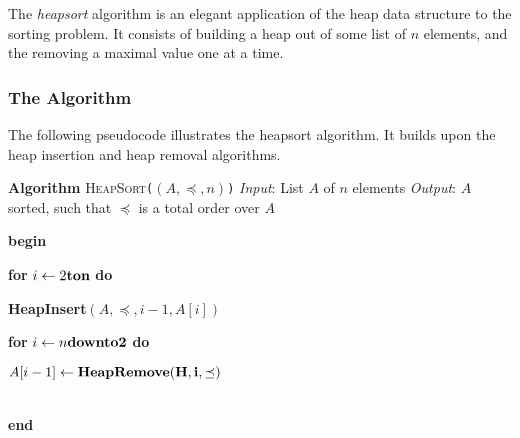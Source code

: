 \documentclass[12pt]{article}
\begin{document}
\newcommand{\Lindent}{0.4in}
\newenvironment{Lalgorithm}[4]{
    \textbf{Algorithm} \textsc{#1}\texttt{(#2)}\newline
    \textit{Input}: #3\newline
    \textit{Output}: #4\newline

}{}
\newenvironment{Lfloatalgorithm}[6][h]{
    \begin{figure}[#1]
    \caption{#2}
    \begin{Lalgorithm}{#3}{#4}{#5}{#6}
}{
    \end{Lalgorithm}
    \end{figure}
}
\newcommand{\Lgets}{\ensuremath{\gets}}
\newcommand{\Lgroup}[1]{\textbf{begin}\\\hspace*{\Lindent}\parbox{\textwidth}{#1}\\\textbf{end}}
\newcommand{\Lif}[2]{\textbf{if} #1 \textbf{then}\\\hspace*{\Lindent}\parbox{\textwidth}{#2}} 
\newcommand{\Lelse}[1]{\textbf{else}\\\hspace*{\Lindent}\parbox{\textwidth}{#1}}
\newcommand{\Lelseif}[2]{\textbf{else if} #1 \textbf{then}\\\hspace*{\Lindent}\parbox{\textwidth}{#2}}
\newcommand{\Lfor}[2]{\textbf{for} #1 \textbf{do}\\\hspace*{\Lindent}\parbox{\textwidth}{#2}}

The \emph{heapsort} algorithm is an elegant application of the heap data structure to the sorting problem.  It consists of building a heap out of some list of $n$ elements, and the removing a maximal value one at a time.

\subsubsection*{The Algorithm}

The following pseudocode illustrates the heapsort algorithm.  It builds upon the heap insertion and heap removal algorithms.

\begin{Lalgorithm}
  {HeapSort}
  {$(A,\preceq,n)$}
  {List $A$ of $n$ elements}
  {$A$ sorted, such that $\preceq$ is a total order over $A$}
\Lgroup{
  \Lfor{$i\gets2\bf{ to }n$}{\bf{HeapInsert}$(A,\preceq,i-1,A[i])$}
  \Lfor{$i\gets n\bf{ downto }2$}{$A[i-1]\gets\bf{HeapRemove}(H,i,\preceq)$}}
\end{Lalgorithm}
\end{document}
